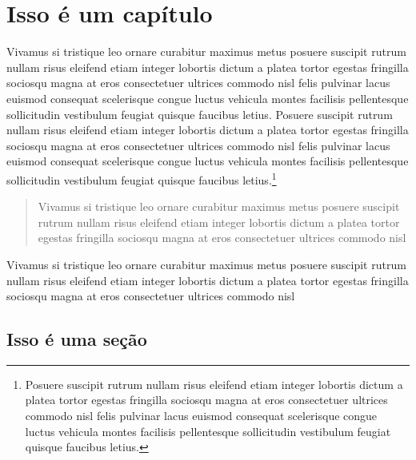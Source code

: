 \chapter{Isso é um capítulo}\label{isso-uxe9-um-capuxedtulo}

Vivamus si tristique leo ornare curabitur maximus metus posuere suscipit
rutrum nullam risus eleifend etiam integer lobortis dictum a platea
tortor egestas fringilla sociosqu magna at eros consectetuer ultrices
commodo nisl felis pulvinar lacus euismod consequat scelerisque congue
luctus vehicula montes facilisis pellentesque sollicitudin vestibulum
feugiat quisque faucibus letius. Posuere suscipit rutrum nullam risus
eleifend etiam integer lobortis dictum a platea tortor egestas fringilla
sociosqu magna at eros consectetuer ultrices commodo nisl felis pulvinar
lacus euismod consequat scelerisque congue luctus vehicula montes
facilisis pellentesque sollicitudin vestibulum feugiat quisque faucibus
letius.\footnote{Posuere suscipit rutrum nullam risus eleifend etiam
  integer lobortis dictum a platea tortor egestas fringilla sociosqu
  magna at eros consectetuer ultrices commodo nisl felis pulvinar lacus
  euismod consequat scelerisque congue luctus vehicula montes facilisis
  pellentesque sollicitudin vestibulum feugiat quisque faucibus letius.}

\begin{quote}
Vivamus si tristique leo ornare curabitur maximus metus posuere suscipit
rutrum nullam risus eleifend etiam integer lobortis dictum a platea
tortor egestas fringilla sociosqu magna at eros consectetuer ultrices
commodo nisl
\end{quote}

\begin{box}
Vivamus si tristique leo ornare curabitur maximus metus posuere suscipit rutrum nullam risus eleifend etiam integer lobortis dictum a platea tortor egestas fringilla sociosqu magna at eros consectetuer ultrices commodo nisl
\end{box}

\section{Isso é uma seção}\label{isso-uxe9-uma-seuxe7uxe3o}

